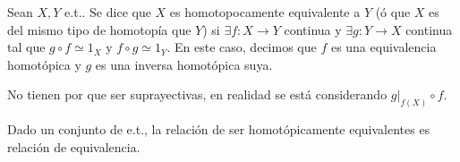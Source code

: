 \begin{defn}
  Sean $X, Y$ e.t.. Se dice que $X$ es homotopocamente equivalente a $Y$ (ó que $X$ es del mismo tipo de homotopía que $Y$) si $\exists f : X \to Y$ continua y $\exists g : Y \to X$ continua tal que $g \circ f \simeq 1_{X}$ y $f \circ g \simeq 1_{Y}$. En este caso, decimos que $f$ es una equivalencia homotópica y $g$ es una inversa homotópica suya.
\end{defn}

\begin{obs}
  No tienen por que ser suprayectivas, en realidad se está considerando $g|_{f(X)} \circ f$.
\end{obs}

\begin{prop}
  Dado un conjunto de e.t., la relación de ser homotópicamente equivalentes es relación de equivalencia.
\end{prop}

